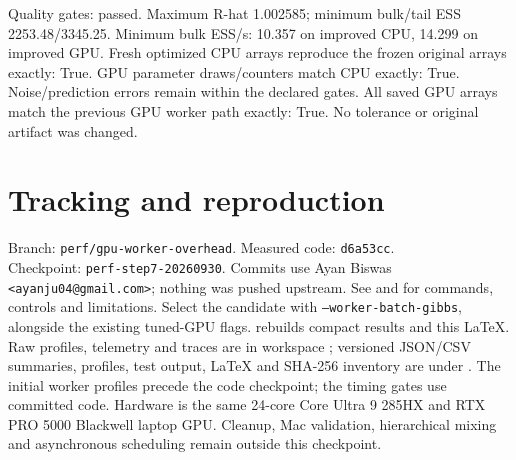 \documentclass[11pt]{article}
\begin{document}
Quality gates: passed. Maximum R-hat 1.002585; minimum bulk/tail ESS 2253.48/3345.25.
Minimum bulk ESS/s: 10.357 on improved CPU, 14.299 on improved GPU.
Fresh optimized CPU arrays reproduce the frozen original arrays exactly: True.
GPU parameter draws/counters match CPU exactly: True. Noise/prediction
errors remain within the declared gates. All saved GPU arrays match the previous
GPU worker path exactly: True. No tolerance or original artifact was changed.
\section*{Tracking and reproduction}
\begingroup\raggedright
Branch: \texttt{perf/gpu-worker-overhead}. Measured code: \texttt{d6a53cc}.\\
Checkpoint: \texttt{perf-step7-20260930}. Commits use Ayan Biswas
\texttt{<ayanju04@gmail.com>}; nothing was pushed upstream.
See  and 
for commands, controls and limitations. Select the candidate with
\texttt{--worker-batch-gibbs}, alongside the existing tuned-GPU flags.
 rebuilds compact results and this LaTeX.
Raw profiles, telemetry and traces are in workspace ;
versioned JSON/CSV summaries, profiles, test output, LaTeX and SHA-256 inventory
are under . The initial worker profiles
precede the code checkpoint; the timing gates use committed code. Hardware is
the same 24-core Core Ultra 9 285HX and RTX PRO 5000 Blackwell laptop GPU.
Cleanup, Mac validation, hierarchical mixing and asynchronous scheduling remain
outside this checkpoint.
\par\endgroup
\end{document}
